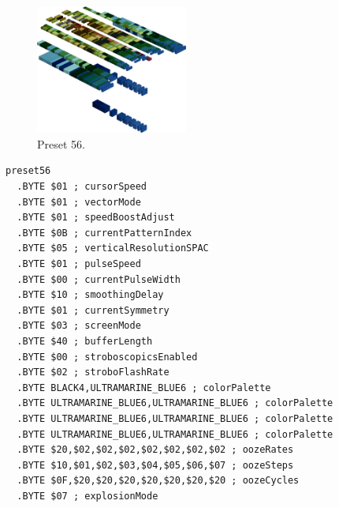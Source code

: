 \vspace*{-0.2cm}
\begin{minipage}[b]{0.48\linewidth}
\begin{figure}[H]                                                          
  \centering                                                             
  \begin{adjustbox}{width=5cm,center}                                   
  \includegraphics[width=5cm]{src/colorspace_presets/preset56-45.png}%
  \end{adjustbox}                                                        
\caption*{Preset 56.}                                           
\end{figure}                                                               
\end{minipage}
\hspace{0.1cm}
\begin{minipage}[b]{0.48\linewidth}                                                                         
\begin{lstlisting}[basicstyle=\ttfamily\tiny]
preset56
  .BYTE $01 ; cursorSpeed
  .BYTE $01 ; vectorMode
  .BYTE $01 ; speedBoostAdjust
  .BYTE $0B ; currentPatternIndex
  .BYTE $05 ; verticalResolutionSPAC
  .BYTE $01 ; pulseSpeed
  .BYTE $00 ; currentPulseWidth
  .BYTE $10 ; smoothingDelay
  .BYTE $01 ; currentSymmetry
  .BYTE $03 ; screenMode
  .BYTE $40 ; bufferLength
  .BYTE $00 ; stroboscopicsEnabled
  .BYTE $02 ; stroboFlashRate
  .BYTE BLACK4,ULTRAMARINE_BLUE6 ; colorPalette
  .BYTE ULTRAMARINE_BLUE6,ULTRAMARINE_BLUE6 ; colorPalette
  .BYTE ULTRAMARINE_BLUE6,ULTRAMARINE_BLUE6 ; colorPalette
  .BYTE ULTRAMARINE_BLUE6,ULTRAMARINE_BLUE6 ; colorPalette
  .BYTE $20,$02,$02,$02,$02,$02,$02,$02 ; oozeRates
  .BYTE $10,$01,$02,$03,$04,$05,$06,$07 ; oozeSteps
  .BYTE $0F,$20,$20,$20,$20,$20,$20,$20 ; oozeCycles
  .BYTE $07 ; explosionMode
\end{lstlisting}
\end{minipage}


